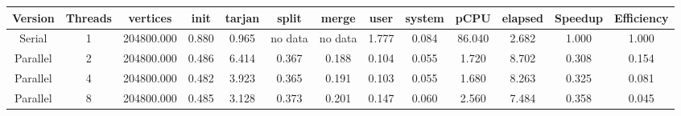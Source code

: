 \begin{tabular}{|c|c|c|c|c|c|c|c|c|c|c|c|c|}
\toprule
 Version &  Threads &   vertices &  init &  tarjan &   split &   merge &  user &  system &   pCPU &  elapsed &  Speedup &  Efficiency \\
\midrule
  Serial &        1 & 204800.000 & 0.880 &   0.965 & no data & no data & 1.777 &   0.084 & 86.040 &    2.682 &    1.000 &       1.000 \\
Parallel &        2 & 204800.000 & 0.486 &   6.414 &   0.367 &   0.188 & 0.104 &   0.055 &  1.720 &    8.702 &    0.308 &       0.154 \\
Parallel &        4 & 204800.000 & 0.482 &   3.923 &   0.365 &   0.191 & 0.103 &   0.055 &  1.680 &    8.263 &    0.325 &       0.081 \\
Parallel &        8 & 204800.000 & 0.485 &   3.128 &   0.373 &   0.201 & 0.147 &   0.060 &  2.560 &    7.484 &    0.358 &       0.045 \\
\bottomrule
\end{tabular}
